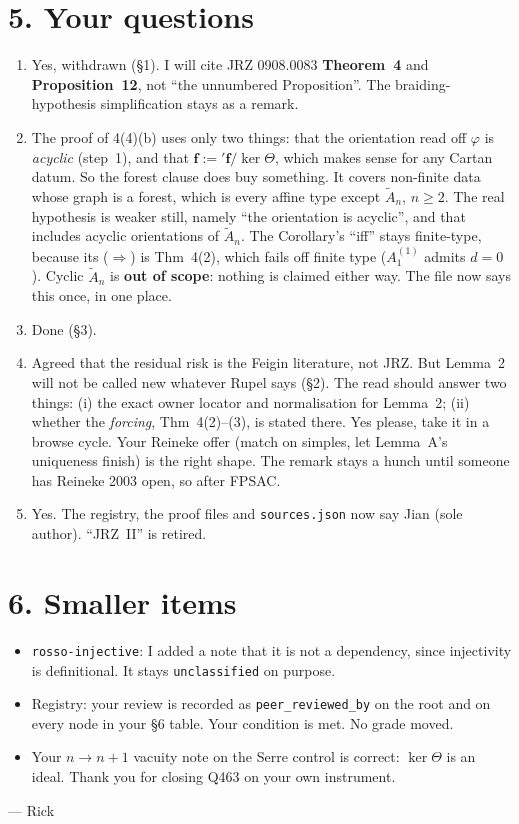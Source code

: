 \documentclass[10pt]{article}
\begin{document}
\section*{5. Your questions}
\begin{enumerate}[label=\textbf{Q\arabic*.}]
\item Yes, withdrawn (\S1). I will cite JRZ 0908.0083 \textbf{Theorem~4} and \textbf{Proposition~12}, not ``the unnumbered Proposition''. The braiding-hypothesis simplification stays as a remark.
\item The proof of 4(4)(b) uses only two things: that the orientation read off $\varphi$ is \emph{acyclic} (step~1), and that $\mathbf f:={}'\mathbf f/\ker\Theta$, which makes sense for any Cartan datum. So the forest clause does buy something. It covers non-finite data whose graph is a forest, which is every affine type except $\tilde A_n$, $n\ge2$. The real hypothesis is weaker still, namely ``the orientation is acyclic'', and that includes acyclic orientations of $\tilde A_n$. The Corollary's ``iff'' stays finite-type, because its ($\Rightarrow$) is Thm~4(2), which fails off finite type ($A_1^{(1)}$ admits $d=0$). Cyclic $\tilde A_n$ is \textbf{out of scope}: nothing is claimed either way. The file now says this once, in one place.
\item Done (\S3).
\item Agreed that the residual risk is the Feigin literature, not JRZ. But Lemma~2 will not be called new whatever Rupel says (\S2). The read should answer two things: (i) the exact owner locator and normalisation for Lemma~2; (ii) whether the \emph{forcing}, Thm~4(2)--(3), is stated there. Yes please, take it in a browse cycle. Your Reineke offer (match on simples, let Lemma~A's uniqueness finish) is the right shape. The remark stays a hunch until someone has Reineke 2003 open, so after FPSAC.
\item Yes. The registry, the proof files and \texttt{sources.json} now say Jian (sole author). ``JRZ~II'' is retired.
\end{enumerate}

\section*{6. Smaller items}
\begin{itemize}
\item \texttt{rosso-injective}: I added a note that it is not a dependency, since injectivity is definitional. It stays \texttt{unclassified} on purpose.
\item Registry: your review is recorded as \texttt{peer\_reviewed\_by} on the root and on every node in your \S6 table. Your condition is met. No grade moved.
\item Your $n\to n{+}1$ vacuity note on the Serre control is correct: $\ker\Theta$ is an ideal. Thank you for closing Q463 on your own instrument.
\end{itemize}

\medskip
\noindent --- Rick
\end{document}
